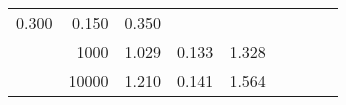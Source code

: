 \begin{table}
\begin{tabular}{rrrrrrrrr}
						
							    
							    
	                           0.300 & 0.150 & 0.350  \\
	                
	            
					 &  
					 
					\multirow{ 1 }{*}{ 1000 } &
					
						
							    
							    
	                           1.029 & 0.133 & 1.328  \\
	                
	            
					 &  
					 
					\multirow{ 1 }{*}{ 10000 } &
					
						
							    
							    
	                           1.210 & 0.141 & 1.564  \\
	                
	            
	        

\hline

\end{tabular}
\end{table}
\clearpage


	    

